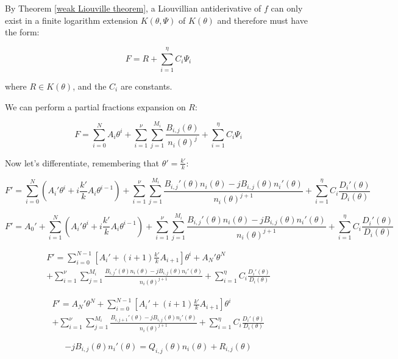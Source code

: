 
\proof

By Theorem \ref{weak Liouville theorem}, a Liouvillian antiderivative
of $f$ can only exist in a finite logarithm extension $K(\theta, \Psi)$
of $K(\theta)$ and therefore must have the form:

$$F = R + \sum_{i=1}^\eta C_i \Psi_i$$

where $R \in K(\theta)$, and the $C_i$ are constants.

We can perform a partial fractions expansion on $R$:

$$F = \sum_{i=0}^N A_i \theta^i
+ \sum_{i=1}^\nu \sum_{j=1}^{M_i} \frac{B_{i,j}(\theta)}{n_i(\theta)^j}
+ \sum_{i=1}^\eta C_i \Psi_i$$

Now let's differentiate, remembering that $\theta' = \frac{k'}{k}$:

$$F' = \sum_{i=0}^N ( A_i' \theta^i + i \frac{k'}{k} A_i \theta^{i-1} )
+ \sum_{i=1}^\nu \sum_{j=1}^{M_i} \frac{B_{i,j}'(\theta) n_i(\theta) - j B_{i,j}(\theta) n_i'(\theta)}{n_i(\theta)^{j+1}}
  + \sum_{i=1}^\eta C_i \frac{D_i'(\theta)}{D_i(\theta)}$$

$$F' = A_0' + \sum_{i=1}^N ( A_i' \theta^i + i \frac{k'}{k} A_i \theta^{i-1} )
+ \sum_{i=1}^\nu \sum_{j=1}^{M_i} \frac{B_{i,j}'(\theta) n_i(\theta) - j B_{i,j}(\theta) n_i'(\theta)}{n_i(\theta)^{j+1}}
  + \sum_{i=1}^\eta C_i \frac{D_i'(\theta)}{D_i(\theta)}$$

\begin{multline*}
F' = \sum_{i=0}^{N-1} \left[ A_i' + (i+1) \frac{k'}{k} A_{i+1} \right] \theta^{i} + A_N' \theta^N \\
+ \sum_{i=1}^\nu \sum_{j=1}^{M_i} \frac{B_{i,j}'(\theta) n_i(\theta) - j B_{i,j}(\theta) n_i'(\theta)}{n_i(\theta)^{j+1}}
  + \sum_{i=1}^\eta C_i \frac{D_i'(\theta)}{D_i(\theta)}
\end{multline*}

\begin{multline*}
F' = A_N' \theta^N + \sum_{i=0}^{N-1} \left[ A_i' + (i+1) \frac{k'}{k} A_{i+1} \right] \theta^{i} \\
+ \sum_{i=1}^\nu \sum_{j=1}^{M_i} \frac{B_{i,j+1}'(\theta) - j B_{i,j}(\theta) n_i'(\theta)}{n_i(\theta)^{j+1}}
  + \sum_{i=1}^\eta C_i \frac{D_i'(\theta)}{D_i(\theta)}
\end{multline*}

$$ - j B_{i,j}(\theta) n_i'(\theta) = Q_{i,j}(\theta) n_i(\theta) + R_{i,j}(\theta)$$

